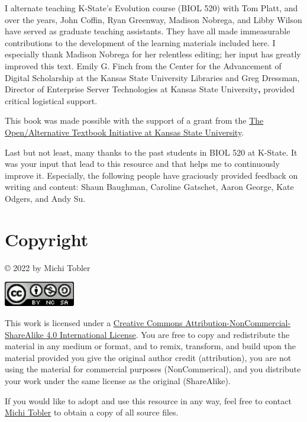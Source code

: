 \documentclass[
]{book}
\begin{document}
I alternate teaching K-State's Evolution course (BIOL 520) with Tom Platt, and over the years, John Coffin, Ryan Greenway, Madison Nobrega, and Libby Wilson have served as graduate teaching assistants. They have all made immeasurable contributions to the development of the learning materials included here. I especially thank Madison Nobrega for her relentless editing; her input has greatly improved this text. Emily G. Finch from the Center for the Advancement of Digital Scholarship at the Kansas State University Libraries and Greg Dressman, Director of Enterprise Server Technologies at Kansas State University\textbf{,} provided critical logistical support.

This book was made possible with the support of a grant from the \href{https://www.lib.k-state.edu/open-textbook}{The Open/Alternative Textbook Initiative at Kansas State University}.

Last but not least, many thanks to the past students in BIOL 520 at K-State. It was your input that lead to this resource and that helps me to continuously improve it. Especially, the following people have graciously provided feedback on writing and content: Shaun Baughman, Caroline Gatschet, Aaron George, Kate Odgers, and Andy Su.

\hypertarget{copyright}{%
\section*{Copyright}\label{copyright}}

© 2022 by Michi Tobler

\includegraphics[width=1.22in]{images/cc}

This work is licensed under a \href{https://creativecommons.org/licenses/by-nc-sa/4.0/}{Creative Commons Attribution-NonCommercial-ShareAlike 4.0 International License}. You are free to copy and redistribute the material in any medium or format, and to remix, transform, and build upon the material provided you give the original author credit (attribution), you are not using the material for commercial purposes (NonCommerical), and you distribute your work under the same license as the original (ShareAlike).

If you would like to adopt and use this resource in any way, feel free to contact \href{mailto:tobler@ksu.edu}{Michi Tobler} to obtain a copy of all source files.
\end{document}
